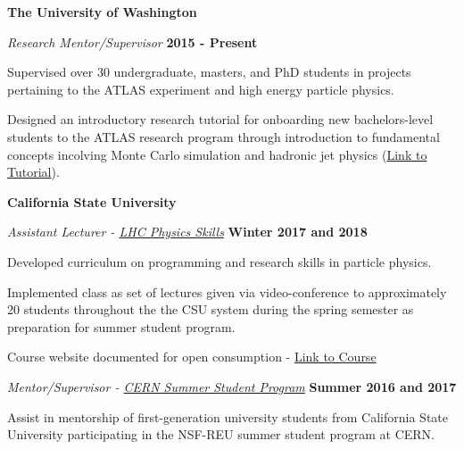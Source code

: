 \documentclass[10pt]{article}
\newenvironment{outerlist}[1][\enskip\textbullet]%
        {\begin{itemize}[#1]}{\end{itemize}%
         \vspace{-.6\baselineskip}}
\newenvironment{innerlist}[1][\enskip\textbullet]%
        {\begin{compactitem}[#1]}{\end{compactitem}}
\begin{document}
\vspace{3mm}

\textbf{The University of Washington}
\begin{outerlist}
\item[] \textit{Research Mentor/Supervisor}%
    \hfill \textbf{2015 - Present}
    \begin{innerlist}
	\item Supervised over 30 undergraduate, masters, and PhD students in projects pertaining to the ATLAS experiment and high energy particle physics.
         \item Designed an introductory research tutorial for onboarding new bachelors-level students to the ATLAS research program through introduction to fundamental concepts incolving Monte Carlo simulation and hadronic jet physics (\href{https://github.com/smeehan12/ToyMCJetsTutorial/blob/master/Note/ToyMCJetTutorial.pdf}{Link to Tutorial}).
    \end{innerlist}
\end{outerlist}

\vspace{3mm}

\textbf{California State University}
\begin{outerlist}
\item[] \textit{Assistant Lecturer - \href{http://zimmer.csufresno.edu/~yogao/ATLAS/NUPAC.html}{LHC Physics Skills}}%
    \hfill \textbf{Winter 2017 and 2018}
    \begin{innerlist}
        \item Developed curriculum on programming and research skills in particle physics.  
        \item Implemented class as set of lectures given via video-conference to approximately 20 students throughout the the CSU system during the spring semester as preparation for summer student program.
        \item Course website documented for open consumption - \href{https://indico.cern.ch/event/609167/}{Link to Course}
    \end{innerlist}
\item[] \textit{Mentor/Supervisor - \href{http://zimmer.csufresno.edu/~yogao/ATLAS/NUPAC.html}{CERN Summer Student Program}}%
    \hfill \textbf{Summer 2016 and 2017}
    \begin{innerlist}
        \item Assist in mentorship of first-generation university students from California State University participating in the NSF-REU summer student program at CERN.
    \end{innerlist}
\end{outerlist}
\end{document}
